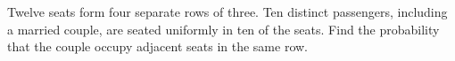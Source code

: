 Twelve seats form four separate rows of three. Ten distinct passengers, including a married couple, are seated uniformly in ten of the seats. Find the probability that the couple occupy adjacent seats in the same row.
